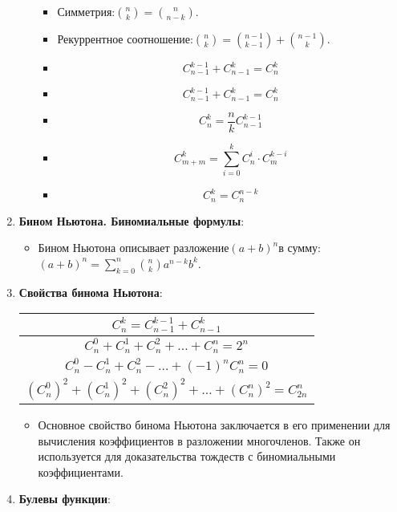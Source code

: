 \documentclass[
]{article}
\providecommand{\tightlist}{%
  \setlength{\itemsep}{0pt}\setlength{\parskip}{0pt}}
\begin{document}
\begin{enumerate}
\begin{itemize}
    \begin{itemize}
    \tightlist
    \item
      Симметрия:\(\binom{n}{k} = \binom{n}{n-k}\).
    \item
      Рекуррентное
      соотношение:\(\binom{n}{k} = \binom{n-1}{k-1} + \binom{n-1}{k}\).
    \item 
      \begin{equation*}
      C_{n-1}^{k-1}+C_{n-1}^{k}=C_{n}^{k} 
      \end{equation*}
    \item 
      \begin{equation*}
      C_{n-1}^{k-1}+C_{n-1}^{k} =C_{n}^{k}
      \end{equation*}
    \item
      \begin{equation*}
      C_{n}^{k}=\frac{n}{k} C_{n-1}^{k-1} \tag{1.3}
      \end{equation*}
    \item
      \begin{equation*}
        C_{m+m}^{k}=\sum_{i=0}^{k} C_{n}^{i} \cdot C_{m}^{k-i}
      \end{equation*}
    \item 
      \begin{equation*}
      C_{n}^{k}=C_{n}^{n-k} 
      \end{equation*}
    \end{itemize}
  \end{itemize}
\item
  \textbf{Бином Ньютона. Биномиальные формулы}:

  \begin{itemize}
  \tightlist
  \item
    Бином Ньютона описывает разложение\((a + b)^n\)в сумму:
    \((a + b)^n = \sum_{k=0}^{n} \binom{n}{k} a^{n-k} b^k\).
  \end{itemize}
\item
  \textbf{Свойства бинома Ньютона}:\\
  \begin{tabular}{c}
  $C_n^k=C_{n-1}^{k-1}+C_{n-1}^k$ \\
  \hline$C_n^0+C_n^1+C_n^2+\ldots+C_n^n=2^n$ \\
  \hline$C_n^0-C_n^1+C_n^2-\ldots+(-1)^n C_n^n=0$ \\
  \hline$\left(C_n^0\right)^2+\left(C_n^1\right)^2+\left(C_n^2\right)^2+\ldots+\left(C_n^n\right)^2=C_{2 n}^n$ \\
  \hline
  \end{tabular}
  \begin{itemize}
  \tightlist
  \item
    Основное свойство бинома Ньютона заключается в его применении для
    вычисления коэффициентов в разложении многочленов. Также он
    используется для доказательства тождеств с биномиальными
    коэффициентами.
  \end{itemize}
\item
  \textbf{Булевы функции}:


\end{enumerate}
\end{document}
